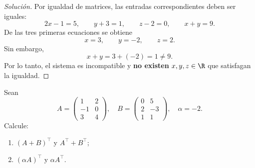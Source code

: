 \documentclass[a4,11pt]{aleph-notas}
\begin{document}
\begin{proof}[Soluci\'on]\hspace{0pt}
Por igualdad de matrices, las entradas correspondientes deben ser iguales:
\[
2x-1=5,\qquad y+3=1,\qquad z-2=0,\qquad x+y=9.
\]
De las tres primeras ecuaciones se obtiene
\[
x=3,\qquad y=-2,\qquad z=2.
\]
Sin embargo,
\[
x+y=3+(-2)=1\neq 9.
\]
Por lo tanto, el sistema es incompatible y \textbf{no existen} $x,y,z\in\R$ que satisfagan la igualdad.
\end{proof}

\begin{ejer}
    Sean
    \[
        A=\begin{pmatrix}1&2\\-1&0\\3&4\end{pmatrix},\quad
        B=\begin{pmatrix}0&5\\2&-3\\1&1\end{pmatrix},\quad
        \alpha=-2.
    \]
    Calcule:
    \begin{enumerate}
        \item $(A+B)^\intercal$ y $A^\intercal + B^\intercal$;
        \item $(\alpha A)^\intercal$ y $\alpha A^\intercal$.
    \end{enumerate}
\end{ejer}
\end{document}
